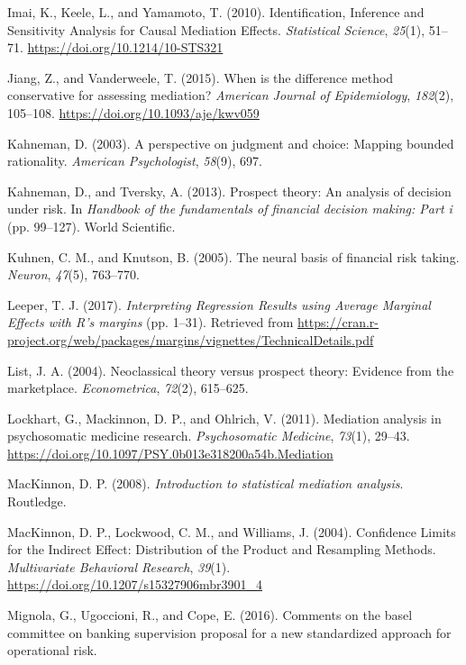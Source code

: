 \documentclass[]{DissertateUSU}
\begin{document}
\hypertarget{ref-Imai2010b}{}
Imai, K., Keele, L., and Yamamoto, T. (2010). Identification, Inference
and Sensitivity Analysis for Causal Mediation Effects. \emph{Statistical
Science}, \emph{25}(1), 51--71. \url{https://doi.org/10.1214/10-STS321}

\hypertarget{ref-Jiang2015}{}
Jiang, Z., and Vanderweele, T. (2015). When is the difference method
conservative for assessing mediation? \emph{American Journal of
Epidemiology}, \emph{182}(2), 105--108.
\url{https://doi.org/10.1093/aje/kwv059}

\hypertarget{ref-kahneman2003perspective}{}
Kahneman, D. (2003). A perspective on judgment and choice: Mapping
bounded rationality. \emph{American Psychologist}, \emph{58}(9), 697.

\hypertarget{ref-kahneman2013prospect}{}
Kahneman, D., and Tversky, A. (2013). Prospect theory: An analysis of
decision under risk. In \emph{Handbook of the fundamentals of financial
decision making: Part i} (pp. 99--127). World Scientific.

\hypertarget{ref-kuhnen2005neural}{}
Kuhnen, C. M., and Knutson, B. (2005). The neural basis of financial
risk taking. \emph{Neuron}, \emph{47}(5), 763--770.

\hypertarget{ref-Leeper2017}{}
Leeper, T. J. (2017). \emph{Interpreting Regression Results using
Average Marginal Effects with R's margins} (pp. 1--31). Retrieved from
\url{https://cran.r-project.org/web/packages/margins/vignettes/TechnicalDetails.pdf}

\hypertarget{ref-list2004neoclassical}{}
List, J. A. (2004). Neoclassical theory versus prospect theory: Evidence
from the marketplace. \emph{Econometrica}, \emph{72}(2), 615--625.

\hypertarget{ref-Lockhart2011}{}
Lockhart, G., Mackinnon, D. P., and Ohlrich, V. (2011). Mediation
analysis in psychosomatic medicine research. \emph{Psychosomatic
Medicine}, \emph{73}(1), 29--43.
\url{https://doi.org/10.1097/PSY.0b013e318200a54b.Mediation}

\hypertarget{ref-mackinnon2008intro}{}
MacKinnon, D. P. (2008). \emph{Introduction to statistical mediation
analysis}. Routledge.

\hypertarget{ref-MacKinnon2004}{}
MacKinnon, D. P., Lockwood, C. M., and Williams, J. (2004). Confidence
Limits for the Indirect Effect: Distribution of the Product and
Resampling Methods. \emph{Multivariate Behavioral Research},
\emph{39}(1). \url{https://doi.org/10.1207/s15327906mbr3901_4}

\hypertarget{ref-mignola2016comments}{}
Mignola, G., Ugoccioni, R., and Cope, E. (2016). Comments on the basel
committee on banking supervision proposal for a new standardized
approach for operational risk.
\end{document}
